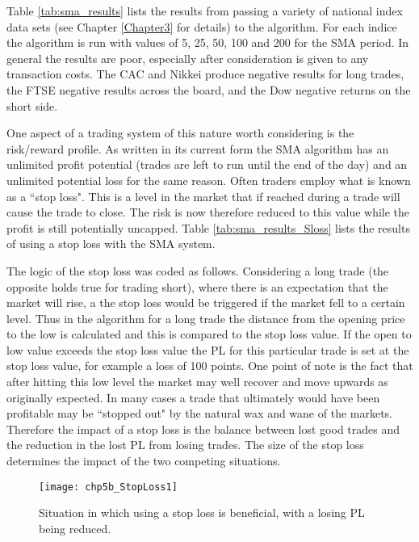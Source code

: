 Table \ref{tab:sma_results} lists the results from passing a variety of national index data sets (see Chapter \ref{Chapter3} for details) to the algorithm. For each indice the algorithm is run with values of 5, 25, 50, 100 and 200 for the SMA period. In general the results are poor, especially after consideration is given to any transaction costs. The CAC and Nikkei produce negative results for long trades, the FTSE negative results across the board, and the Dow negative returns on the short side.




One aspect of a trading system of this nature worth considering is the risk/reward profile. As written in its current form the SMA algorithm has an unlimited profit potential (trades are left to run until the end of the day) and an unlimited potential loss for the same reason. Often traders employ what is known as a \textquotedblleft stop loss". This is a level in the market that if reached during a trade will cause the trade to close. The risk is now therefore reduced to this value while the profit is still potentially uncapped. Table \ref{tab:sma_results_Sloss} lists the results of using a stop loss with the SMA system.

The logic of the stop loss was coded as follows. Considering a long trade (the opposite holds true for trading short), where there is an expectation that the market will rise, a the stop loss would be triggered if the market fell to a certain  level. Thus in the algorithm for a long trade the distance from the opening price to the low is calculated and this is compared to the stop loss value. If the open to low value exceeds the stop loss value the PL for this particular trade is set at the stop loss value, for example a loss of 100 points. One point of note is the fact that after hitting this low level the market may well recover and move upwards as originally expected. In many cases a trade that ultimately would have been profitable may be \textquotedblleft stopped out" by the natural wax and wane of the markets. Therefore the impact of a stop loss is the balance between lost good trades and the reduction in the lost PL from losing trades. The size of the stop loss determines the impact of the two competing situations.

\begin{figure}[tbph]
\centering
\texttt{[image: chp5b\_StopLoss1]}
\caption[Situation in which using a stop loss is beneficial]{Situation in which using a stop loss is beneficial, with a losing PL being reduced.}
\label{fig:chp5:sloss1}
\end{figure}

